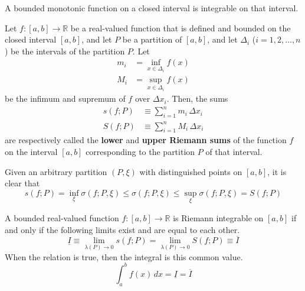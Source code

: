   \begin{corollary}
  A bounded monotonic function on a closed interval is integrable on that interval. 
  \end{corollary}

  \begin{definition}
    Let $f: [a, b] \longrightarrow \mathbb{R}$ be a real-valued function that is defined and bounded on the closed interval $[a, b]$, and let $P$ be a partition of $[a, b]$, and let $\Delta_i$ ($i = 1, 2, \ldots, n$) be the intervals of the partition $P$. Let 
    \begin{align*}
        m_i &= \inf_{x \in \Delta_i} f(x) \\
        M_i &= \sup_{x \in \Delta_i} f(x)
    \end{align*}
    be the infimum and supremum of $f$ over $\Delta x_i$. Then, the sums
    \begin{align*}
        s(f; P) & \equiv \sum_{i = 1}^n m_i \, \Delta x_i \\
        S(f; P) & \equiv \sum_{i=1}^n M_i \, \Delta x_i
    \end{align*}
    are respectively called the \textbf{lower} and \textbf{upper Riemann sums} of the function $f$ on the interval $[a, b]$ corresponding to the partition $P$ of that interval. 

    Given an arbitrary partition $(P, \xi)$ with distinguished points on $[a, b]$, it is clear that
    \[s(f; P) = \inf_{\xi} \sigma(f; P, \xi) \leq \sigma(f; P, \xi) \leq \sup_{\xi} \sigma(f; P, \xi) = S(f; P)\]
  \end{definition}

  \begin{theorem}
  A bounded real-valued function $f: [a, b] \longrightarrow \mathbb{R}$ is Riemann integrable on $[a, b]$ if and only if the following limits exist and are equal to each other. 
  \[\underline{I} \equiv \lim_{\lambda(P) \rightarrow 0} s(f; P) = \lim_{\lambda(P) \rightarrow 0} S(f; P) \equiv \overline{I}\]
  When the relation is true, then the integral is this common value. 
  \[\int_a^b f(x) \,dx = \underline{I} = \overline{I}\]
  \end{theorem}

